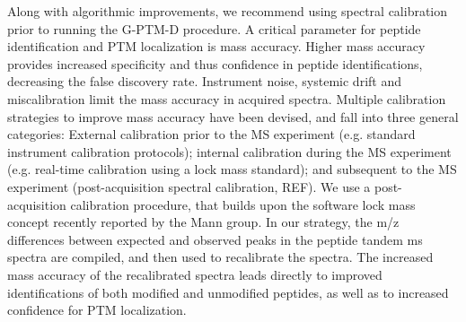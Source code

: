 \documentclass[journal=jprobs,manuscript=article]{achemso}
\begin{document}
Along with algorithmic improvements, we recommend using spectral calibration prior to running the G-PTM-D procedure. A critical parameter for peptide identification and PTM localization is mass accuracy\cite{Scherl_2008}. Higher mass accuracy provides increased specificity and thus confidence in peptide identifications, decreasing the false discovery rate.  Instrument noise, systemic drift and miscalibration limit the mass accuracy in acquired spectra.  Multiple calibration strategies to improve mass accuracy have been devised, and fall into three general categories:  External calibration prior to the MS experiment (e.g. standard instrument calibration protocols); internal calibration during the MS experiment (e.g. real-time calibration using a lock mass standard\cite{Olsen_2005}); and subsequent to the MS experiment (post-acquisition spectral calibration, REF).  We use a post-acquisition calibration procedure, that builds upon the software lock mass concept\cite{Cox_2011} recently reported by the Mann group.  In our strategy, the m/z differences between expected and observed peaks in the peptide tandem ms spectra are compiled, and then used to recalibrate the spectra.  The increased mass accuracy of the recalibrated spectra leads directly to improved identifications of both modified and unmodified peptides, as well as to increased confidence for PTM localization.
\end{document}
